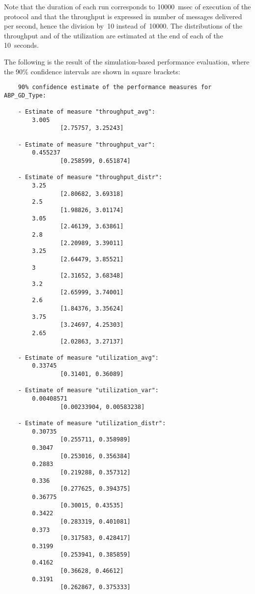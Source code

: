 \noindent Note that the duration of each run corresponds to 10000~msec of execution of the protocol and that
the throughput is expressed in number of messages delivered per second, hence the division by~10 instead
of~10000. The distributions of the throughput and of the utilization are estimated at the end of each of the
10~seconds.

The following is the result of the simulation-based performance evaluation, where the 90\% confidence
intervals are shown in square brackets:

        \begin{verbatim}
    90% confidence estimate of the performance measures for ABP_GD_Type:

    - Estimate of measure "throughput_avg":
        3.005
                [2.75757, 3.25243]

    - Estimate of measure "throughput_var":
        0.455237
                [0.258599, 0.651874]

    - Estimate of measure "throughput_distr":
        3.25
                [2.80682, 3.69318]
        2.5
                [1.98826, 3.01174]
        3.05
                [2.46139, 3.63861]
        2.8
                [2.20989, 3.39011]
        3.25
                [2.64479, 3.85521]
        3
                [2.31652, 3.68348]
        3.2
                [2.65999, 3.74001]
        2.6
                [1.84376, 3.35624]
        3.75
                [3.24697, 4.25303]
        2.65
                [2.02863, 3.27137]

    - Estimate of measure "utilization_avg":
        0.33745
                [0.31401, 0.36089]

    - Estimate of measure "utilization_var":
        0.00408571
                [0.00233904, 0.00583238]

    - Estimate of measure "utilization_distr":
        0.30735
                [0.255711, 0.358989]
        0.3047
                [0.253016, 0.356384]
        0.2883
                [0.219288, 0.357312]
        0.336
                [0.277625, 0.394375]
        0.36775
                [0.30015, 0.43535]
        0.3422
                [0.283319, 0.401081]
        0.373
                [0.317583, 0.428417]
        0.3199
                [0.253941, 0.385859]
        0.4162
                [0.36628, 0.46612]
        0.3191
                [0.262867, 0.375333]
        \end{verbatim}



